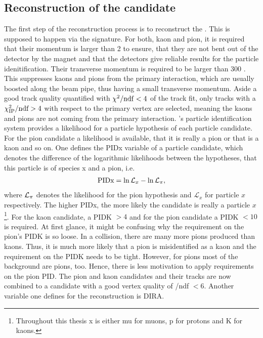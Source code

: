 \subsection{Reconstruction of the \Dz candidate}
\label{sec:Selection_D0}
The first step of the reconstruction process is to reconstruct the \Dz.
This is supposed to happen via the \DToKpi signature.
For both, kaon and pion, it is required that their momentum is larger than 2 \gev to ensure, that they are not bent out of the detector by the magnet and that the \rich detectors give reliable results for the particle idenitification.
Their transverse momentum is required to be larger than 300 \mev.
This suppresses kaons and pions from the primary interaction, which are usually boosted along the beam pipe, thus having a small transverse momentum.
Aside a good track quality quantified with $\chi^2/\mathrm{ndf} < 4$ of the track fit, only tracks with a $\chi^2_{\rm IP}/\text{ndf} > 4$  with respect to the primary vertex are selected, meaning the kaons and pions are not coming from the primary interaction.
\lhcb's particle identification system provides a likelihood for a particle hypothesis of each particle candidate.
For the pion candidate a likelihood is available, that it is really a pion or that is a kaon and so on.
One defines the PIDx variable of a particle candidate, which denotes the difference of the logarithmic likelihoods between the hypotheses, that this particle is of species x and a pion, i.e.
\begin{align}
    \text{PIDx} = \ln \mathcal{L}_x - \ln \mathcal{L}_{\pi}, \label{eq:PIDdef}
\end{align}
where $\mathcal{L}_{{\pi}}$ denotes the likelihood for the pion hypothesis and $\mathcal{L}_{x}$ for particle $x$ respectively.
The higher PIDx, the more likely the candidate is really a particle $x$\footnote{Throughout this thesis x is either mu for muons, p for protons and K for kaons.}.
For the kaon candidate, a PIDK $>4$ and for the pion candidate a PIDK $<10$ is required.
At first glance, it might be confusing why the requirement on the pion's PIDK is so loose.
In a \proton\proton collision, there are many more pions produced than kaons.
Thus, it is much more likely that a pion is misidentified as a kaon and the requirement on the PIDK needs to be tight.
However, for pions most of the background are pions, too.
Hence, there is less motivation to apply requirements on the pion PID.
The pion and kaon candidates and their tracks are now combined to a \Dz candidate with a good vertex quality of \chisqvtx/ndf $<6$.
Another variable one defines for the reconstruction is DIRA.
